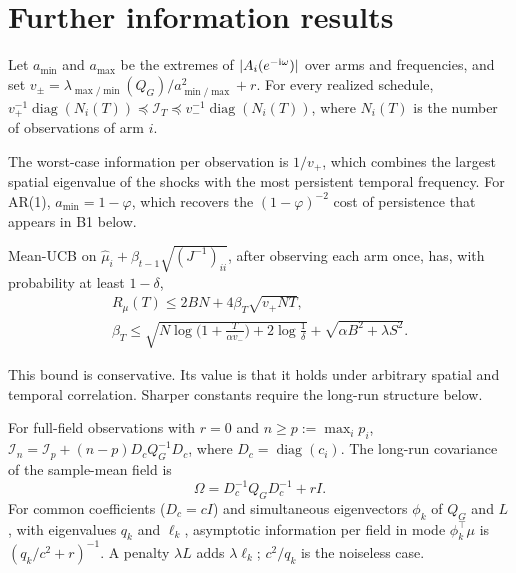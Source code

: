\documentclass[sigconf,review,anonymous]{acmart}
\newcommand{\diag}{\operatorname{diag}}
\newcommand{\I}{\mathcal{I}}
\begin{document}



\appendix

\section{Further information results}\label{app:info}

\begin{proposition}\label{prop:sandwich}
Let $a_{\min}$ and $a_{\max}$ be the extremes of $|A_i(e^{-{\rm i}\omega})|$ over arms and frequencies, and set $v_\pm=\lambda_{\max/\min}(Q_G)/a_{\min/\max}^2+r$. For every realized schedule, $v_+^{-1}\diag(N_i(T))\preceq\I_T\preceq v_-^{-1}\diag(N_i(T))$, where $N_i(T)$ is the number of observations of arm $i$.
\end{proposition}

The worst-case information per observation is $1/v_+$, which combines the largest spatial eigenvalue of the shocks with the most persistent temporal frequency. For AR(1), $a_{\min}=1-\varphi$, which recovers the $(1-\varphi)^{-2}$ cost of persistence that appears in B1 below.

\begin{corollary}\label{cor:ucb}
Mean-UCB on $\hat\mu_i+\beta_{t-1}\sqrt{(J^{-1})_{ii}}$, after observing each arm once, has, with probability at least $1-\delta$,
\begin{gather*}
R_\mu(T)\le2BN+4\beta_T\sqrt{v_+NT},\\
\beta_T\le\sqrt{N\log\big(1+\tfrac{T}{\alpha v_-}\big)+2\log\tfrac1\delta}+\sqrt{\alpha B^2+\lambda S^2}.
\end{gather*}
\end{corollary}

This bound is conservative. Its value is that it holds under arbitrary spatial and temporal correlation. Sharper constants require the long-run structure below.

\begin{proposition}\label{prop:lr}
For full-field observations with $r=0$ and $n\ge p:=\max_i p_i$, $\I_n=\I_p+(n-p)D_cQ_G^{-1}D_c$, where $D_c=\diag(c_i)$. The long-run covariance of the sample-mean field is
\[
\Omega=D_c^{-1}Q_GD_c^{-1}+rI.
\]
For common coefficients ($D_c=cI$) and simultaneous eigenvectors $\phi_k$ of $Q_G$ and $L$, with eigenvalues $q_k$ and $\ell_k$, asymptotic information per field in mode $\phi_k^\top\mu$ is $(q_k/c^2+r)^{-1}$. A penalty $\lambda L$ adds $\lambda\ell_k$; $c^2/q_k$ is the noiseless case.
\end{proposition}
\end{document}
